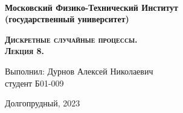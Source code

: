 

\begin{titlepage}
\begin{center}
\

\large\textbf{Московский Физико-Технический Институт}\\
\large\textbf{(государственный университет)}
\vfill

{\LARGE \textsc{\textbf{Дискретные случайные процессы.\\ Лекция 8.\\}}}

\vspace{10em}


\begin{flushright}
    \normalsize{Выполнил: Дурнов Алексей Николаевич \\ студент Б01-009\\}
\end{flushright}
\vfill

Долгопрудный, 2023
\end{center}
\end{titlepage}


\newpage

